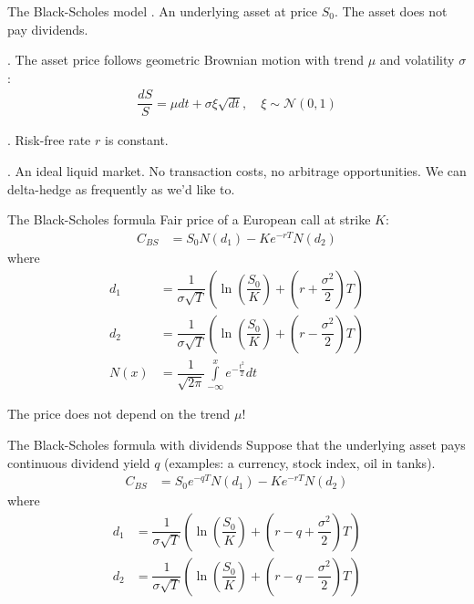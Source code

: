 \documentclass{beamer}
\begin{document}
\begin{frame}{The Black-Scholes model}
. An underlying asset at price $S_0$. The asset does not pay dividends.

. The asset price follows geometric Brownian motion with trend $\mu$ and volatility $\sigma$:
\begin{align*}
\dfrac{dS}{S} = \mu dt + \sigma\xi\sqrt{dt}, \quad \xi \sim \mathcal{N}(0,1)
\end{align*}

. Risk-free rate $r$ is constant.

. An ideal liquid market. No transaction costs, no arbitrage opportunities. We can delta-hedge as frequently as we'd like to.
\end{frame}



\begin{frame}{The Black-Scholes formula}
\justify
Fair price of a European call at strike $K$:
\begin{align*}
C_{BS} &= S_0N(d_1) - Ke^{-rT}N(d_2)
\end{align*}
where
\begin{align*}
d_1 &= \dfrac{1}{\sigma\sqrt{T}}\left( \ln\left(\dfrac{S_0}{K}\right) + \left(r + \dfrac{\sigma^2}{2}\right)T\right) \\
d_2 &= \dfrac{1}{\sigma\sqrt{T}}\left( \ln\left(\dfrac{S_0}{K}\right) + \left(r - \dfrac{\sigma^2}{2}\right)T\right) \\
N(x) &= \dfrac{1}{\sqrt{2\pi}}\int\limits_{-\infty}^x e^{-\frac{t^2}{2}}dt
\end{align*}

\justify
The price does not depend on the trend  $\mu$!
\end{frame}



\begin{frame}{The Black-Scholes formula with dividends}
\justify
Suppose that the underlying asset pays continuous dividend yield $q$ (examples: a currency, stock index, oil in tanks).
\begin{align*}
C_{BS} &= S_0e^{-qT}N(d_1) - Ke^{-rT}N(d_2)
\end{align*}
where
\begin{align*}
d_1 &= \dfrac{1}{\sigma\sqrt{T}}\left( \ln\left(\dfrac{S_0}{K}\right) + \left(r -q + \dfrac{\sigma^2}{2}\right)T\right) \\
d_2 &= \dfrac{1}{\sigma\sqrt{T}}\left( \ln\left(\dfrac{S_0}{K}\right) + \left(r -q- \dfrac{\sigma^2}{2}\right)T\right)
\end{align*}
\end{frame}
\end{document}
